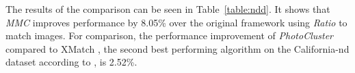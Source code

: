 The results of the comparison can be seen in Table~\ref{table:ndd}. It 
shows that \emph{MMC} improves performance by 8.05\% over the original 
framework using \emph{Ratio} to match images. For comparison, the 
performance improvement of \emph{PhotoCluster} compared to XMatch 
\cite{zhao2009scale}, the second best performing algorithm on the 
California-nd dataset according to \cite{vas2013cluster}, is 2.52\%.

